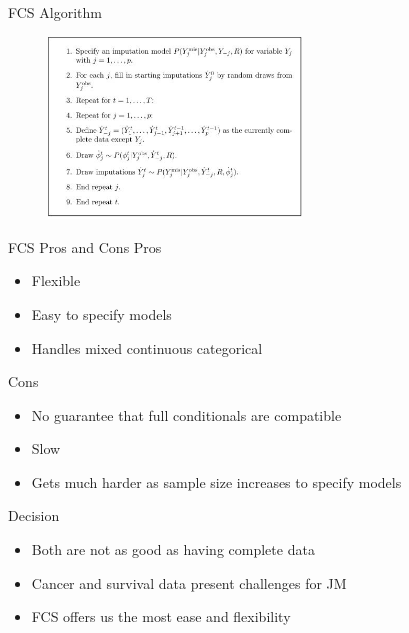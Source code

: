 \begin{frame}{FCS Algorithm}
  \begin{figure}[h!]
  \centering
    \includegraphics[width=0.6\textwidth]{fcs_algo}
\label{fig:fcsexample}
\end{figure}
\end{frame}

\begin{frame}{FCS Pros and Cons}
Pros
 \begin{itemize}
  \item Flexible
  \item Easy to specify models
  \item Handles mixed continuous categorical
 \end{itemize}

 Cons
 \begin{itemize}
  \item No guarantee that full conditionals are compatible
  \item Slow
  \item Gets much harder as sample size increases to specify models
 \end{itemize}

\end{frame}

\begin{frame}{Decision}
 \begin{itemize}
  \item Both are not as good as having complete data
  \item Cancer and survival data present challenges for JM
  \item FCS offers us the most ease and flexibility
 \end{itemize}
\end{frame}

